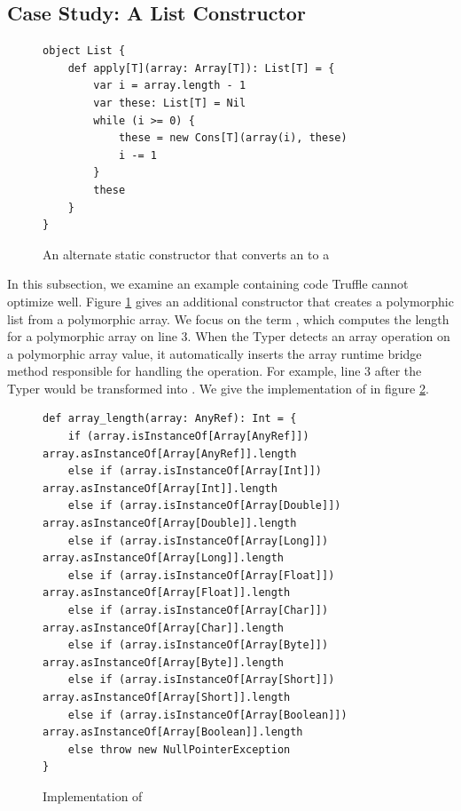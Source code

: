 \subsection{Case Study: A List Constructor}

\begin{figure}[!htb]
\begin{verbatim}
object List {
	def apply[T](array: Array[T]): List[T] = {
		var i = array.length - 1
		var these: List[T] = Nil
		while (i >= 0) {
			these = new Cons[T](array(i), these)
			i -= 1
		}
		these
	}	
}
\end{verbatim}
\caption{An alternate static constructor that converts an  to a }
\label{impl:list-alt-constructor}
\end{figure}

In this subsection, we examine an example containing code Truffle cannot optimize well.
Figure \ref{impl:list-alt-constructor} gives an additional constructor that creates a polymorphic list from a polymorphic array.
We focus on the term , which computes the length for a polymorphic array on line $3$.
When the Typer detects an array operation on a polymorphic array value, it automatically inserts the array runtime bridge method responsible for handling the operation.
For example, line $3$ after the Typer would be transformed into .
We give the implementation of  in figure \ref{impl:array-length}.

\begin{figure}[!htb]
\begin{verbatim}
def array_length(array: AnyRef): Int = {
	if (array.isInstanceOf[Array[AnyRef]])       array.asInstanceOf[Array[AnyRef]].length
	else if (array.isInstanceOf[Array[Int]])     array.asInstanceOf[Array[Int]].length
	else if (array.isInstanceOf[Array[Double]])  array.asInstanceOf[Array[Double]].length
	else if (array.isInstanceOf[Array[Long]])    array.asInstanceOf[Array[Long]].length
	else if (array.isInstanceOf[Array[Float]])   array.asInstanceOf[Array[Float]].length
	else if (array.isInstanceOf[Array[Char]])    array.asInstanceOf[Array[Char]].length
	else if (array.isInstanceOf[Array[Byte]])    array.asInstanceOf[Array[Byte]].length
	else if (array.isInstanceOf[Array[Short]])   array.asInstanceOf[Array[Short]].length
	else if (array.isInstanceOf[Array[Boolean]]) array.asInstanceOf[Array[Boolean]].length
	else throw new NullPointerException
}
\end{verbatim}
\caption{Implementation of }
\label{impl:array-length}
\end{figure}

